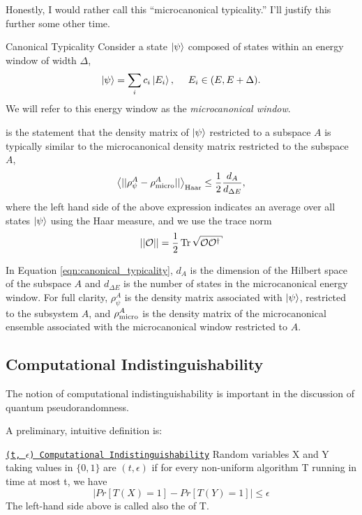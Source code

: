 Honestly, I would rather call this ``microcanonical typicality.''
%
I'll justify this further some other time.

\begin{definition}{Canonical Typicality}{}
    Consider a state \(\ket{\psi}\) composed of states within an energy window of width \(\Delta\),
    \begin{equation}
        \ket{\psi} = \sum_{i} c_i \ket{E_i},
        ~~~~
        E_i \in (E, E + \Delta)
        .
    \end{equation}
    We will refer to this energy window as the \textit{microcanonical window}.

     is the statement that the density matrix of \(\ket{\psi}\) restricted to a subspace \(A\) is typically similar to the microcanonical density matrix restricted to the subspace \(A\),
    \begin{align}
        \label{eqn:canonical_typicality}
        \left\langle ||\rho^A_\psi - \rho^A_{\rm micro} || \right\rangle_{\rm Haar} \leq \frac{1}{2} \frac{d_A}{d_{\Delta E}}
        ,
    \end{align}
    where the left hand side of the above expression indicates an average over all states \(\ket{\psi}\) using the Haar measure, and we use the trace norm
    \begin{align}
        ||\mathcal{O}|| = \frac{1}{2} \Tr\sqrt{\mathcal{O}\mathcal{O}^\dagger}
    \end{align}

    
    In Equation \ref{eqn:canonical_typicality}, \(d_A\) is the dimension of the Hilbert space of the subspace \(A\) and \(d_{\Delta E}\) is the number of states in the microcanonical energy window.
    For full clarity, \(\rho^A_\psi\) is the density matrix associated with \(\ket{\psi}\), restricted to the subsystem \(A\), and \(\rho^A_{\rm micro}\) is the density matrix of the microcanonical ensemble associated with the microcanonical window restricted to \(A\).
\end{definition}


\subsection{Computational Indistinguishability}
The notion of computational indistinguishability is important in the discussion of quantum pseudorandomness.

A preliminary, intuitive definition is:
\begin{definition}{
\href{
https://people.seas.harvard.edu/~salil/pseudorandomness/pseudorandomness-Aug12.pdf\#page=148\&zoom=200,0,500
}
{\texttt{(t, \(\epsilon\)) Computational Indistinguishability}}
}{}
    Random variables X and Y taking values in \(\{0, 1\}\) are \((t, \epsilon)\)  if for every non-uniform algorithm T running in time at most t, we have
    \begin{equation}
        \left|Pr\left[T(X)=1\right] - Pr\left[T(Y)=1\right]\right| \leq \epsilon
    \end{equation}
    The left-hand side above is called also the  of T.
\end{definition}

